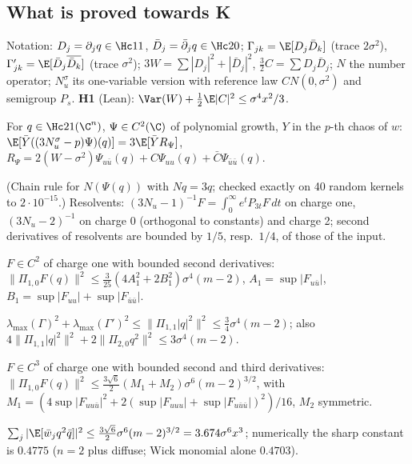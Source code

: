 \subsection{What is proved towards K}\label{sec:Kproved}
Notation: $D_j=\partial_jq\in\Hc11$, $\bar D_j=\bar\partial_jq\in\Hc20$; $\Gamma_{jk}=\E[D_j\bar D_k]$ (trace $2\sigma^2$), $\Gamma'_{jk}=\E[\bar D_j\overline{\bar D_k}]$ (trace $\sigma^2$);
$3W=\sum|D_j|^2+|\bar D_j|^2$, $\tfrac32C=\sum D_j\bar D_j$; $N$ the number operator; $N_u^\sigma$ its one-variable version with reference law $CN(0,\sigma^2)$ and
semigroup $P_s$. \textbf{H1} (Lean): $\Var(W)+\tfrac12\E|C|^2\le\sigma^4x^2/3$.
\begin{theorem}\label{thm:resolvent}
For $q\in\Hc21(\C^n)$, $\Psi\in C^2(\C)$ of polynomial growth, $Y$ in the $p$-th chaos of $w$:
$\E[\bar Y((3N_u^\sigma-p)\Psi)(q)]=3\E[\bar YR_\Psi]$, $R_\Psi=2(W-\sigma^2)\Psi_{u\bar u}(q)+C\Psi_{uu}(q)+\bar C\Psi_{\bar u\bar u}(q)$.
\end{theorem}
(Chain rule for $N(\Psi(q))$ with $Nq=3q$; checked exactly on 40 random kernels to $2\cdot10^{-15}$.) Resolvents: $(3N_u-1)^{-1}F=\int_0^\infty e^tP_{3t}F\,dt$ on charge one,
$(3N_u-2)^{-1}$ on charge 0 (orthogonal to constants) and charge 2; second derivatives of resolvents are bounded by $1/5$, resp.\ $1/4$, of those of the input.
\begin{theorem}
$F\in C^2$ of charge one with bounded second derivatives: $\|\Pi_{1,0}F(q)\|^2\le\tfrac3{25}(4A_1^2+2B_1^2)\sigma^4(m-2)$, $A_1=\sup|F_{u\bar u}|$, $B_1=\sup|F_{uu}|+\sup|F_{\bar u\bar u}|$.
\end{theorem}
\begin{theorem}[influences, \st{P}]
$\lambda_{\max}(\Gamma)^2+\lambda_{\max}(\Gamma')^2\le\|\Pi_{1,1}|q|^2\|^2\le\tfrac34\sigma^4(m-2)$; also $4\|\Pi_{1,1}|q|^2\|^2+2\|\Pi_{2,0}q^2\|^2\le3\sigma^4(m-2)$.
\end{theorem}
\begin{theorem}
$F\in C^3$ of charge one with bounded second and third derivatives: $\|\Pi_{1,0}F(q)\|^2\le\tfrac{3\sqrt6}2(M_1+M_2)\sigma^6(m-2)^{3/2}$, with
$M_1=(4\sup|F_{uu\bar u}|^2+2(\sup|F_{uuu}|+\sup|F_{u\bar u\bar u}|)^2)/16$, $M_2$ symmetric.
\end{theorem}
\begin{corollary}
$\sum_j|\E[\bar w_jq^2\bar q]|^2\le\tfrac{3\sqrt6}2\sigma^6(m-2)^{3/2}=3.674\sigma^6x^3$; numerically the sharp constant is $0.4775$ ($n=2$ plus diffuse; Wick monomial alone $0.4703$).
\end{corollary}
